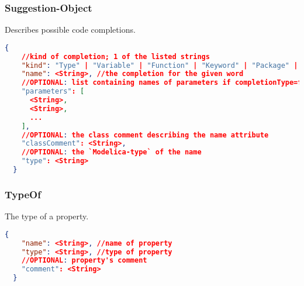   \subsubsection{Suggestion-Object}
  Describes possible code completions.
  \newline{}
  \begin{lstlisting}[basicstyle=\small,language=json]
  {
    //kind of completion; 1 of the listed strings
    "kind": "Type" | "Variable" | "Function" | "Keyword" | "Package" | "Model" | "Class" | "Property",
    "name": <String>, //the completion for the given word
    //OPTIONAL: list containing names of parameters if completionType=function
    "parameters": [
      <String>,
      <String>,
      ...
    ],
    //OPTIONAL: the class comment describing the name attribute
    "classComment": <String>,
    //OPTIONAL: the `Modelica-type` of the name
    "type": <String>
  }
  \end{lstlisting}


  \subsubsection{TypeOf}
  The type of a property.
  \newline{}
  \begin{lstlisting}[basicstyle=\small,language=json]
  {
    "name": <String>, //name of property
    "type": <String>, //type of property
    //OPTIONAL: property's comment
    "comment": <String>
  }
  \end{lstlisting}
